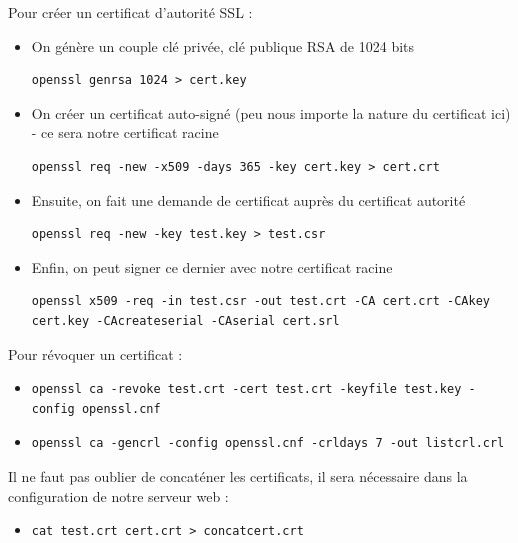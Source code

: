 Pour créer un certificat d'autorité SSL :
\begin{itemize}
\item On génère un couple clé privée, clé publique RSA de 1024 bits\\
\begin{verbatim}
openssl genrsa 1024 > cert.key
\end{verbatim}
\item On créer un certificat auto-signé (peu nous importe la nature du certificat ici) - ce sera notre certificat racine\\
\begin{verbatim}
openssl req -new -x509 -days 365 -key cert.key > cert.crt
\end{verbatim}
\item Ensuite, on fait une demande de certificat auprès du certificat autorité\\
\begin{verbatim}
openssl req -new -key test.key > test.csr
\end{verbatim}
\item Enfin, on peut signer ce dernier avec notre certificat racine\\
\begin{verbatim}
openssl x509 -req -in test.csr -out test.crt -CA cert.crt -CAkey cert.key -CAcreateserial -CAserial cert.srl
\end{verbatim}
\end{itemize}

Pour révoquer un certificat :
\begin{itemize}
\item 
\begin{verbatim}
openssl ca -revoke test.crt -cert test.crt -keyfile test.key -config openssl.cnf
\end{verbatim}
\item 
\begin{verbatim}
openssl ca -gencrl -config openssl.cnf -crldays 7 -out listcrl.crl
\end{verbatim}
\end{itemize}

Il ne faut pas oublier de concaténer les certificats, il sera nécessaire dans la configuration de notre serveur web :
\begin{itemize}
\item 
\begin{verbatim}
cat test.crt cert.crt > concatcert.crt
\end{verbatim}
\end{itemize}

